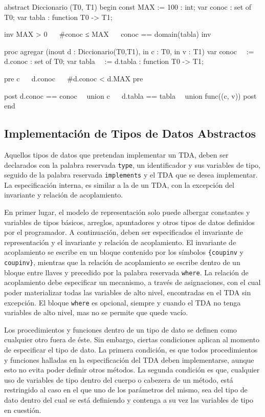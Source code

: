 \begin{gracielacode}
abstract Diccionario (T0, T1) begin
  const MAX := 100 : int;
  var   conoc      : set of T0;
  var   tabla      : function T0 -> T1;

  {inv MAX > 0 ~\Land~ #conoc ≤ MAX ~\Land~ conoc == domain(tabla) inv}  
  
  proc agregar (inout d : Diccionario(T0,T1), in c : T0, in v : T1)
    var conoc~\Apost~ := d.conoc : set of T0;
    var tabla~\Apost~ := d.tabla : function T0 -> T1;

    {pre c ~\Notelem~ d.conoc ~\Land~ #d.conoc < d.MAX pre}

    {post  d.conoc == conoc~\Apost~ union {c}
        ~\Land~ d.tabla == tabla~\Apost~ union func({(c, v)}) post}
end
\end{gracielacode}

\subsection{Implementación de Tipos de Datos Abstractos}

Aquellos tipos de datos que pretendan implementar un TDA, deben ser declarados
con la palabra reservada \texttt{type}, un identificador y sus variables de
tipo, seguido de la palabra reservada \texttt{implements} y el TDA que se
desea implementar. La especificación interna, es similar a la de un TDA, con la
excepción del invariante y relación de acoplamiento.

En primer lugar, el modelo de representación solo puede albergar constantes y
variables de tipos básicos, arreglos, apuntadores y otros tipos de datos
definidos por el programador. A continuación, deben ser especificados el
invariante de representación y el invariante y relación de acoplamiento. El
invariante de acoplamiento se escribe en un bloque contenido por los símbolos
\texttt{\{coupinv} y \texttt{coupinv\}}, mientras que la relación de
acoplamiento se escribe dentro de un bloque entre llaves y precedido por la
palabra reservada \texttt{where}. La relación de acoplamiento debe especificar
un mecanismo, a través de asignaciones, con el cual poder materializar todas
las variables de alto nivel, encontradas en el TDA sin excepción. El bloque
\texttt{where} es opcional, siempre y cuando el TDA no tenga variables de alto
nivel, mas no se permite que quede vacío.

Los procedimientos y funciones dentro de un tipo de dato se definen como
cualquier otro fuera de éste. Sin embargo, ciertas condiciones aplican al
momento de especificar el tipo de dato. La primera condición, es que todos
procedimientos y funciones halladas en la especificación del TDA deben
implementarse, aunque esto no evita poder definir otros métodos. La segunda
condición es que, cualquier uso de variables de tipo dentro del cuerpo o
cabezera de un método, está restringido al caso en el que uno de los
parámetros del mismo, sea del tipo de dato dentro del cual se está definiendo
y contenga a su vez las variables de tipo en cuestión.

